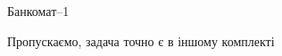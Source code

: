 ﻿\begin{problemAllDefault}{Банкомат--1}\label{problem:ATM-basic}

Пропускаємо, задача точно є в іншому комплекті

\end{problemAllDefault}
 
